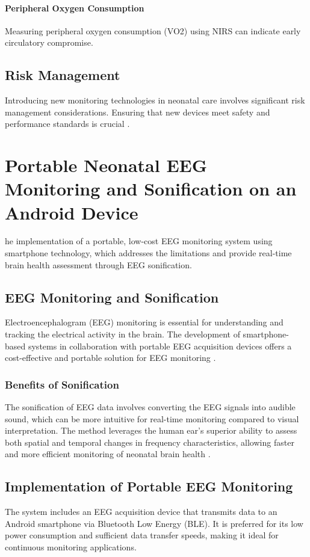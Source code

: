\documentclass[12pt,journal,compsoc]{IEEEtran}
\begin{document}
\paragraph{Peripheral Oxygen Consumption}
Measuring peripheral oxygen consumption (VO2) using NIRS can indicate early circulatory compromise. 

\subsection{Risk Management}
Introducing new monitoring technologies in neonatal care involves significant risk management considerations. Ensuring that new devices meet safety and performance standards is crucial \cite{IEEEhowto:nicklin}.

\section{Portable Neonatal EEG Monitoring and Sonification on an Android Device}
he implementation of a portable, low-cost EEG monitoring system using smartphone technology, which addresses the limitations and provide real-time brain health assessment through EEG sonification.

\subsection{EEG Monitoring and Sonification}
Electroencephalogram (EEG) monitoring is essential for understanding and tracking the electrical activity in the brain. The development of smartphone-based systems in collaboration with portable EEG acquisition devices offers a cost-effective and portable solution for EEG monitoring \cite{IEEEhowto:poveda}.

\subsubsection{Benefits of Sonification}
The sonification of EEG data involves converting the EEG signals into audible sound, which can be more intuitive for real-time monitoring compared to visual interpretation. The method leverages the human ear's superior ability to assess both spatial and temporal changes in frequency characteristics, allowing faster and more efficient monitoring of neonatal brain health \cite{IEEEhowto:poveda}.

\subsection{Implementation of Portable EEG Monitoring}
The system includes an EEG acquisition device that transmits data to an Android smartphone via Bluetooth Low Energy (BLE). It is preferred for its low power consumption and sufficient data transfer speeds, making it ideal for continuous monitoring applications.
\end{document}
